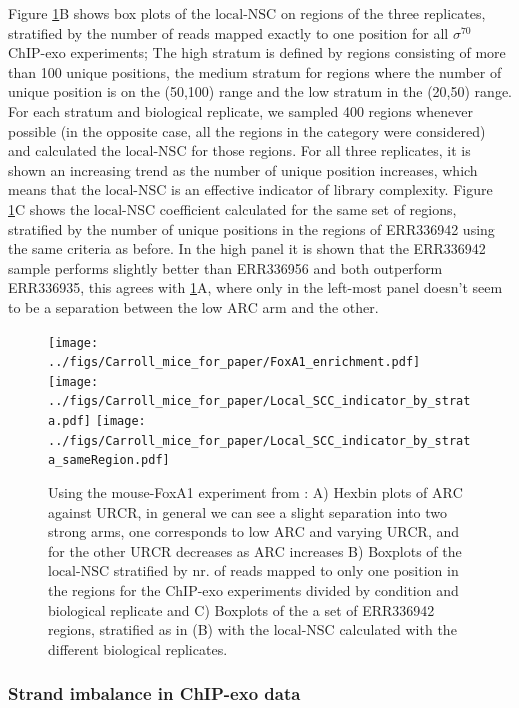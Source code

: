 \documentclass{bmcart}\usepackage[]{graphicx}\usepackage[]{color}
\begin{document}
Figure \ref{fig:enrich}B shows box plots of the $\mbox{local-NSC}$ on
regions of the three replicates, stratified by the number of reads
mapped exactly to one position for all $\sigma^{70}$ ChIP-exo
experiments; The high stratum is defined by regions consisting of more
than 100 unique positions, the medium stratum for regions
where the number of unique position is on the
(50,100) range and the low stratum in the
(20,50) range. For each stratum and biological
replicate, we sampled 400 regions whenever possible (in the
opposite case, all the regions in the category were considered) and
calculated the $\mbox{local-NSC}$ for those regions. For all three
replicates, it is shown an increasing trend as the number of unique
position increases, which means that the $\mbox{local-NSC}$ is an
effective indicator of library complexity. Figure \ref{fig:enrich}C
shows the $\mbox{local-NSC}$ coefficient calculated for the same set
of regions, stratified by the number of unique positions in the
regions of ERR336942 using the same criteria as before. In the high
panel it is shown that the ERR336942 sample performs slightly better
than ERR336956 and both outperform ERR336935, this agrees with
\ref{fig:enrich}A, where only in the left-most panel doesn't seem to
be a separation between the low $\mbox{ARC}$ arm and the other.

\begin{figure}[h!]
  \centering
  \texttt{[image: ../figs/Carroll\_mice\_for\_paper/FoxA1\_enrichment.pdf]}
  \texttt{[image: ../figs/Carroll\_mice\_for\_paper/Local\_SCC\_indicator\_by\_strata.pdf]}
  \texttt{[image: ../figs/Carroll\_mice\_for\_paper/Local\_SCC\_indicator\_by\_strata\_sameRegion.pdf]}
  \caption{Using the mouse-FoxA1 experiment from \cite{exoillumina}:
    A) Hexbin plots of $\mbox{ARC}$ against $\mbox{URCR}$, in general
    we can see a slight separation into two strong arms, one
    corresponds to low $\mbox{ARC}$ and varying $\mbox{URCR}$, and for
    the other $\mbox{URCR}$ decreases as $\mbox{ARC}$ increases B)
    Boxplots of the $\mbox{local-NSC}$ stratified by nr. of reads
    mapped to only one position in the regions for the ChIP-exo
    experiments divided by condition and biological replicate and C)
    Boxplots of the a set of ERR336942 regions, stratified as in (B)
    with the $\mbox{local-NSC}$ calculated with the different
    biological replicates.}
  \label{fig:enrich}
\end{figure}


\subsubsection{Strand imbalance in ChIP-exo data}
\label{sec:strand_imbalance}
\end{document}
